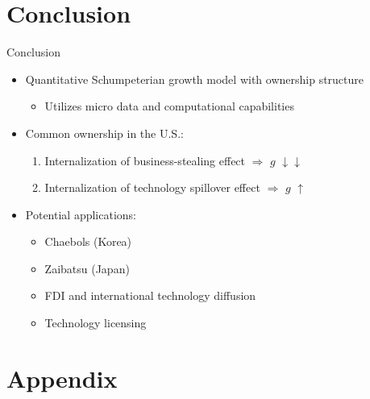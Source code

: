 \documentclass[
  10pt,
  aspectratio=169,   %
]{beamer}
\theoremstyle{plain}
\begin{document}
\section{Conclusion}
\begin{frame}{Conclusion}
  \begin{itemize}
    \item Quantitative Schumpeterian growth model with ownership structure
          \begin{itemize}
            \item Utilizes micro data and computational capabilities
          \end{itemize}
          \medskip{}
    \item Common ownership in the U.S.:
          \begin{enumerate}
            \item Internalization of business-stealing effect $\Longrightarrow$ $g$ $\downarrow\downarrow$
            \item Internalization of technology spillover effect $\Longrightarrow$ $g$ $\uparrow$
          \end{enumerate}
          \medskip{}
    \item Potential applications:
          \begin{itemize}
            \item Chaebols (Korea)
            \item Zaibatsu (Japan)
            \item FDI and international technology diffusion
            \item Technology licensing
          \end{itemize}
  \end{itemize}
\end{frame}

\appendix
\section{Appendix}
\end{document}
